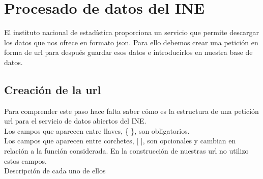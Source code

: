  \section{Procesado de datos del INE}
El instituto nacional de estadística proporciona un servicio que permite descargar los datos que nos ofrece en formato json. Para ello debemos crear una petición en forma de url para después guardar esos datos e introducirlos en nuestra base de datos.
 \subsection{Creación de la url}
 Para comprender este paso hace falta saber cómo es la estructura de una petición url para el servicio de datos abiertos del INE. \cite{ine:urljson}\\
Los campos que aparecen entre llaves, \{ \}, son obligatorios.\\
Los campos que aparecen entre corchetes, [ ], son opcionales y cambian en relación a la función considerada. En la construcción de nuestras url no utilizo estos campos.\\
Descripción de cada uno de ellos
